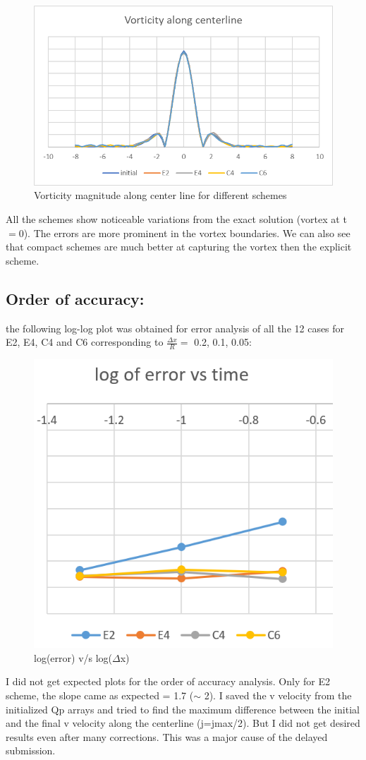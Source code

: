 \documentclass{hcmut-report}
\begin{document}
    \begin{figure}[h!]
        \centering
        \includegraphics[width=0.5\linewidth]{graphics/center.png}
        \caption{Vorticity magnitude along center line for different schemes}
        \label{fig:my_label}
    \end{figure}

    All the schemes show noticeable variations from the exact solution (vortex at t$=0$). The errors are more prominent in the vortex boundaries. We can also see that compact schemes are much better at capturing the vortex then the explicit scheme.

    \subsection{Order of accuracy: }

    the following log-log plot was obtained for error analysis of all the 12 cases for E2, E4, C4 and C6 corresponding to $\frac{\Delta x}{R} =$ 0.2, 0.1, 0.05:
    
    \begin{figure}[h!]
        \centering
        \includegraphics[width=0.5\linewidth]{graphics/error.png}
        \caption{log(error) v/s log($\Delta$x)}
        \label{fig:my_label}
    \end{figure}

    I did not get expected plots for the order of accuracy analysis. Only for E2 scheme, the slope came as expected = 1.7 ($\sim$ 2). I saved the v velocity from the initialized Qp arrays and tried to find the maximum difference between the initial and the final v velocity along the centerline (j=jmax/2). But I did not get desired results even after many corrections. This was a major cause of the delayed submission. 
\end{document}
